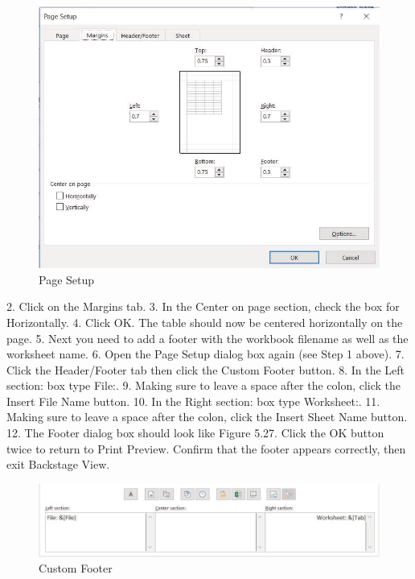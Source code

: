 \begin{figure}[H]
	\centering
	\includegraphics[width=\maxwidth{.95\linewidth}]{gfx/ch05_fig26}
	\caption{Page Setup}
	\label{05:fig26}
\end{figure}





2.   Click on the Margins tab.
3.   In the Center on page section, check the box for Horizontally.
4.   Click OK. The table should now be centered horizontally on the page.
5.   Next you need to add a footer with the workbook filename as well as the worksheet name.
6.   Open the Page Setup dialog box again (see Step 1 above).
7.   Click the Header/Footer tab then click the Custom Footer button.
8.   In the Left section: box type File:.
9.   Making sure to leave a space after the colon, click the Insert File Name button.
10.   In the Right section: box type Worksheet:.
11.   Making sure to leave a space after the colon, click the Insert Sheet Name button.
12.   The Footer dialog box should look like Figure 5.27. Click the OK button twice to return to Print
Preview. Confirm that the footer appears correctly, then exit Backstage View.



\begin{figure}[H]
	\centering
	\includegraphics[width=\maxwidth{.95\linewidth}]{gfx/ch05_fig27}
	\caption{Custom Footer}
	\label{05:fig27}
\end{figure}





